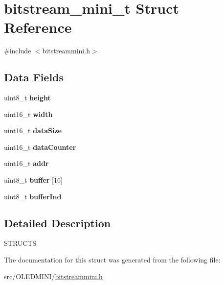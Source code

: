 \hypertarget{structbitstream__mini__t}{}\section{bitstream\+\_\+mini\+\_\+t Struct Reference}
\label{structbitstream__mini__t}


{\ttfamily \#include $<$bitstreammini.\+h$>$}

\subsection*{Data Fields}
\begin{DoxyCompactItemize}
\item 
uint8\+\_\+t {\bfseries height}\hypertarget{structbitstream__mini__t_adcf201a8aabf55cb352ec05331242594}{}\label{structbitstream__mini__t_adcf201a8aabf55cb352ec05331242594}

\item 
uint16\+\_\+t {\bfseries width}\hypertarget{structbitstream__mini__t_ad0eab1042455a2067c812ab8071d5376}{}\label{structbitstream__mini__t_ad0eab1042455a2067c812ab8071d5376}

\item 
uint16\+\_\+t {\bfseries data\+Size}\hypertarget{structbitstream__mini__t_afe5dbe9ff0f4a3d528fdd0697ad730eb}{}\label{structbitstream__mini__t_afe5dbe9ff0f4a3d528fdd0697ad730eb}

\item 
uint16\+\_\+t {\bfseries data\+Counter}\hypertarget{structbitstream__mini__t_a36604b3e39edbb524b1d1d2b2616b58e}{}\label{structbitstream__mini__t_a36604b3e39edbb524b1d1d2b2616b58e}

\item 
uint16\+\_\+t {\bfseries addr}\hypertarget{structbitstream__mini__t_a41a6aad09727eb120338c35535a652a6}{}\label{structbitstream__mini__t_a41a6aad09727eb120338c35535a652a6}

\item 
uint8\+\_\+t {\bfseries buffer} \mbox{[}16\mbox{]}\hypertarget{structbitstream__mini__t_a39a88290a5fbb1b3f35ca4c174271a00}{}\label{structbitstream__mini__t_a39a88290a5fbb1b3f35ca4c174271a00}

\item 
uint8\+\_\+t {\bfseries buffer\+Ind}\hypertarget{structbitstream__mini__t_af3e2e80d32b281ee6cba238ff27eb258}{}\label{structbitstream__mini__t_af3e2e80d32b281ee6cba238ff27eb258}

\end{DoxyCompactItemize}


\subsection{Detailed Description}
S\+T\+R\+U\+C\+TS 

The documentation for this struct was generated from the following file\+:\begin{DoxyCompactItemize}
\item 
src/\+O\+L\+E\+D\+M\+I\+N\+I/\hyperlink{bitstreammini_8h}{bitstreammini.\+h}\end{DoxyCompactItemize}
